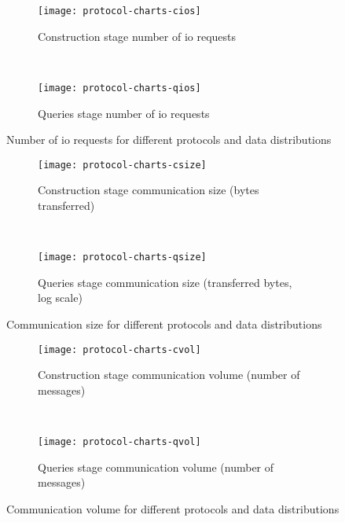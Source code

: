 \begin{figure*}[ht!]
	\captionsetup[subfigure]{justification=centering}
	\centering
	\begin{subfigure}[t]{0.5\textwidth}
		\centering
		\texttt{[image: protocol-charts-cios]}
		\caption{Construction stage number of \acrshort{io} requests}%
		\label{figure:protocols-ios:c}
	\end{subfigure}%
	~ %
	\begin{subfigure}[t]{0.5\textwidth}
		\centering
		\texttt{[image: protocol-charts-qios]}
		\caption{Queries stage number of \acrshort{io} requests}%
		\label{figure:protocols-ios:q}
	\end{subfigure}%
	\caption{Number of \acrshort{io} requests for different protocols and data distributions}%
	\label{figure:protocols-ios}
\end{figure*}

\begin{figure*}[ht!]
	\captionsetup[subfigure]{justification=centering}
	\centering
	\begin{subfigure}[t]{0.5\textwidth}
		\centering
		\texttt{[image: protocol-charts-csize]}
		\caption{Construction stage communication size (bytes transferred)}%
		\label{figure:protocols-size:c}
	\end{subfigure}%
	~ %
	\begin{subfigure}[t]{0.5\textwidth}
		\centering
		\texttt{[image: protocol-charts-qsize]}
		\caption{Queries stage communication size (transferred bytes, log scale)}%
		\label{figure:protocols-size:q}
	\end{subfigure}%
	\caption{Communication size for different protocols and data distributions}%
	\label{figure:protocols-size}
\end{figure*}

\begin{figure*}[ht!]
	\captionsetup[subfigure]{justification=centering}
	\centering
	\begin{subfigure}[t]{0.5\textwidth}
		\centering
		\texttt{[image: protocol-charts-cvol]}
		\caption{Construction stage communication volume (number of messages)}%
		\label{figure:protocols-vol:c}
	\end{subfigure}%
	~ %
	\begin{subfigure}[t]{0.5\textwidth}
		\centering
		\texttt{[image: protocol-charts-qvol]}
		\caption{Queries stage communication volume (number of messages)}%
		\label{figure:protocols-vol:q}
	\end{subfigure}%
	\caption{Communication volume for different protocols and data distributions}%
	\label{figure:protocols-vol}
\end{figure*}
